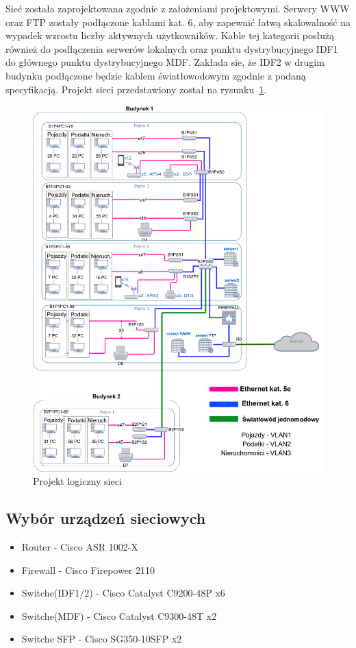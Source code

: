\documentclass[12pt,a4paper]{article}
\begin{document}
	    Sieć została zaprojektowana zgodnie z założeniami projektowymi.
	    Serwery WWW oraz FTP zostały podłączone kablami kat. 6, aby zapewnić łatwą skalowalność na wypadek wzrostu liczby aktywnych użytkowników.
	    Kable tej kategorii posłużą również do podłączenia serwerów lokalnych oraz punktu dystrybucyjnego IDF1 do głównego punktu dystrybucyjnego MDF.
	    Zakłada sie, że IDF2 w drugim budynku podłączone będzie kablem światłowodowym zgodnie z podaną specyfikacją.
	    Projekt sieci przedstawiony został na rysunku~\ref{fig:projekt}.
	\begin{figure}[H]
	    \centering
	    \includegraphics[width = \textwidth]{obrazki/diag.png}
	    \caption{Projekt logiczny sieci}
	    \label{fig:projekt}
	\end{figure}
	    
	\subsection{Wybór urządzeń sieciowych}
	
	\begin{itemize}
		\item Router - Cisco ASR 1002-X
		\item Firewall - Cisco Firepower 2110
		\item Switche(IDF1/2) - Cisco Catalyst C9200-48P x6
		\item Switche(MDF) - Cisco Catalyst C9300-48T x2
		\item Switche SFP - Cisco SG350-10SFP x2
	\end{itemize}
\end{document}
